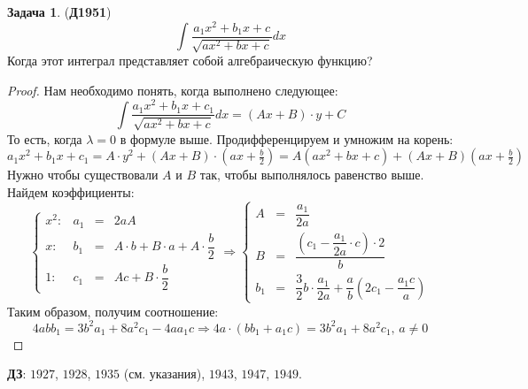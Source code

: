 \documentclass[12pt]{article}
\theoremstyle{definition}
\newtheorem{problem}{Задача}
\DeclareMathOperator{\dint}{\displaystyle\int}
\begin{document}
\begin{problem}(\textbf{Д1951})
	$$
		\dint \dfrac{a_1x^2 + b_1 x + c}{\sqrt{ax^2 + bx + c}}dx
	$$
	Когда этот интеграл представляет собой алгебраическую функцию? 
\end{problem}
\begin{proof}
	Нам необходимо понять, когда выполнено следующее:
	$$
		\dint \dfrac{a_1x^2 + b_1 x + c_1}{\sqrt{ax^2 + bx + c}}dx = (Ax + B){\cdot}y + C
	$$
	То есть, когда $\lambda = 0$ в формуле выше. Продифференцируем и умножим на корень:
	$$
		a_1 x^2 + b_1 x + c_1 = A{\cdot}y^2 + (Ax +B){\cdot}\left(ax + \tfrac{b}{2}\right)	= A(ax^2 + bx + c) + (Ax +B)\left(ax + \tfrac{b}{2}\right)
	$$
	Нужно чтобы существовали $A$ и $B$ так, чтобы выполнялось равенство выше. Найдем коэффициенты:
	$$
		\left\{
			\begin{matrix}
				x^2 \colon & a_1 &=& 2aA \\[8pt]
				x \colon & b_1 &=&  A{\cdot}b + B{\cdot}a + A{\cdot}\dfrac{b}{2}\\[8pt]
				1 \colon & c_1 &=& Ac + B{\cdot} \dfrac{b}{2}
			\end{matrix}
		\right. \Rightarrow 
		\left\{
			\begin{matrix}
				A &=& \dfrac{a_1}{2a}\\[10pt]
				B &=& \dfrac{\left(c_1 - \dfrac{a_1}{2a}{\cdot}c\right){\cdot}2}{b}\\[10pt]
				b_1 &=& \dfrac{3}{2}b{\cdot}\dfrac{a_1}{2a} + \dfrac{a}{b}\left(2c_1 - \dfrac{a_1 c}{a}\right)
			\end{matrix}
		\right.		
	$$
	Таким образом, получим соотношение:
	$$
		4abb_1 = 3b^2a_1 + 8a^2c_1 - 4aa_1 c \Rightarrow 4a{\cdot}(bb_1 + a_1c) = 3b^2a_1 + 8a^2c_1, \, a \neq 0
	$$
\end{proof}

\textbf{ДЗ}: $1927$, $1928$, $1935$ (см. указания), $1943$, $1947$, $1949$.
\end{document}
